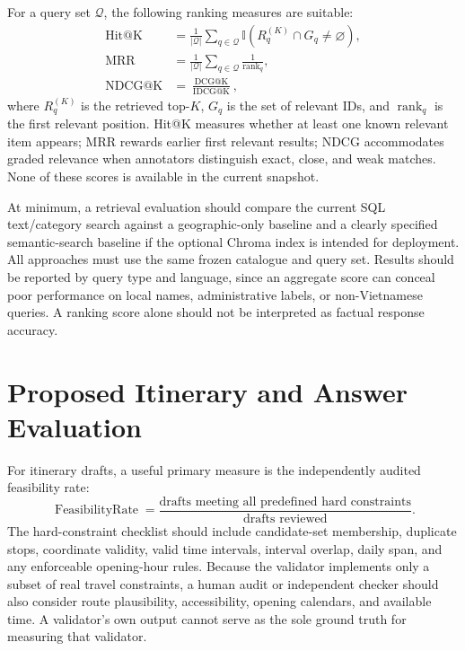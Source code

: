 For a query set $\mathcal{Q}$, the following ranking measures are suitable:
\begin{align}
    \operatorname{Hit@K}
    &= \frac{1}{|\mathcal{Q}|}
       \sum_{q\in\mathcal{Q}}
       \mathbb{I}\left(R_q^{(K)}\cap G_q\ne\varnothing\right),\\
    \operatorname{MRR}
    &= \frac{1}{|\mathcal{Q}|}
       \sum_{q\in\mathcal{Q}}\frac{1}{\operatorname{rank}_q},\\
    \operatorname{NDCG@K}
    &= \frac{\operatorname{DCG@K}}{\operatorname{IDCG@K}},
\end{align}
where $R_q^{(K)}$ is the retrieved top-$K$, $G_q$ is the set of relevant IDs, and $\operatorname{rank}_q$ is the first relevant position. Hit@K measures whether at least one known relevant item appears; MRR rewards earlier first relevant results; NDCG accommodates graded relevance when annotators distinguish exact, close, and weak matches. None of these scores is available in the current snapshot.

At minimum, a retrieval evaluation should compare the current SQL text/category search against a geographic-only baseline and a clearly specified semantic-search baseline if the optional Chroma index is intended for deployment. All approaches must use the same frozen catalogue and query set. Results should be reported by query type and language, since an aggregate score can conceal poor performance on local names, administrative labels, or non-Vietnamese queries. A ranking score alone should not be interpreted as factual response accuracy.

\section{Proposed Itinerary and Answer Evaluation}

For itinerary drafts, a useful primary measure is the independently audited feasibility rate:
\begin{equation}
    \operatorname{FeasibilityRate}
    = \frac{\text{drafts meeting all predefined hard constraints}}
           {\text{drafts reviewed}}.
\end{equation}
The hard-constraint checklist should include candidate-set membership, duplicate stops, coordinate validity, valid time intervals, interval overlap, daily span, and any enforceable opening-hour rules. Because the validator implements only a subset of real travel constraints, a human audit or independent checker should also consider route plausibility, accessibility, opening calendars, and available time. A validator's own  output cannot serve as the sole ground truth for measuring that validator.


